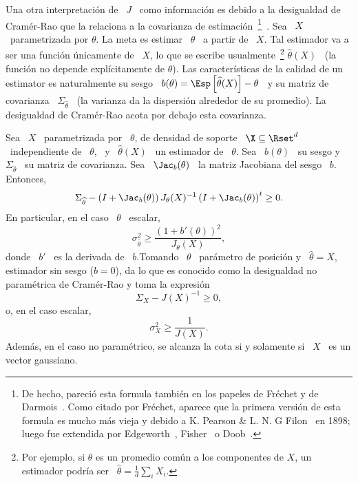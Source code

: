 Una  otra  interpretaci\'on  de \  $J$  \  como  informaci\'on  es debido  a  la
desigualdad   de   Cram\'er-Rao   que   la   relaciona  a   la   covarianza   de
estimaci\'on~\footnote{De hecho, pareci\'o esta formula tambi\'en en los papeles
  de  Fr\'echet y  de Darmois~\cite{Fre43,  Dar45}. Como  citado  por Fr\'echet,
  aparece que la primera versi\'on de esta formula es mucho m\'as vieja y debido
  a K.  Pearson  \& L. N.  G Filon~\cite{PeaFil98} en  1898; luego fue extendida
  por          Edgeworth~\cite{Edg08},          Fisher~\cite{Fis25:07}         o
  Doob~\cite{Doo36}.}~\cite{Rao45,  Rao92,  RaoWis47,  Cra46,  Rio07,  CovTho06,
  Fri04, Kay93,  Bos07}.  Sea \  $X$ \ parametrizada  por $\theta$.  La  meta es
estimar \ $\theta$  \ a partir de \  $X$.  Tal estimador va a  ser una funci\'on
\'unicamente de  \ $X$, lo  que se escribe usualmente~\footnote{Por  ejemplo, si
  $\theta$  es  un promedio  com\'un  a los  componentes  de  $X$, un  estimador
  podr\'ia    ser    \     $\widehat{\theta}    =    \frac1d    \sum_i    X_i$.}
$\widehat{\theta}(X)$ \ (la funci\'on  no depende expl\'icitamente de $\theta$).
Las caracter\'isticas de  la calidad de un estimator es  naturalmente su sesgo \
$b(\theta) = \Esp\left[  \widehat{\theta}(X) \right] - \theta$ \  y su matriz de
covarianza  \  $\Sigma_{\widehat{\theta}}$ \  (la  varianza  da la  dispersi\'on
alrededor de su promedio).  La desigualdad de Cram\'er-Rao acota por debajo esta
covarianza.
%
\begin{teorema}
  Sea  \ $X$  \  parametrizada por  \ $\theta$,  de  densidad de  soporte \  $\X
  \subseteq \Rset^d$ \ independiente de  \ $\theta$, \ y \ $\widehat{\theta}(X)$
  \  un  estimador   de  \  $\theta$.   Sea  \  $b(\theta)$  \   su  sesgo  y  \
  $\Sigma_{\widehat{\theta}}$ \ su matriz de covarianza.  Sea \ $\Jac_b(\theta)$
  \ la matriz Jacobiana del sesgo \ $b$.  Entonces,
  \[
  \Sigma_{\widehat{\theta}} - \left( I + \Jac_b(\theta) \right) J_\theta(X)^{-1}
  \left( I + \Jac_b(\theta) \right)^t \ge 0.
  \]
  En particular, en el caso \ $\theta$ \ escalar,
  \[
  \sigma_{\widehat{\theta}}^2 \ge \frac{(1+b'(\theta))^2}{J_\theta(X)},
  \]
  donde  \  $b'$ \  es  la  derivada de  \  $b$.\newline  Tomando  \ $\theta$  \
  par\'ametro de posici\'on y \  $\widehat{\theta} = X$, estimador sin sesgo ($b
  =  0$),  da  lo que  es  conocido  como  la  desigualdad no  param\'etrica  de
  Cram\'er-Rao y toma la expresi\'on
  \[
  \Sigma_X - J(X)^{-1} \ge 0,
  \]
  o, en el caso escalar,
  \[
  \sigma_X^2 \ge \frac{1}{J(X)}.
  \]
  Adem\'as, en el caso no param\'etrico, se  alcanza la cota si y solamente si \
  $X$ \ es un vector gaussiano.
\end{teorema}
